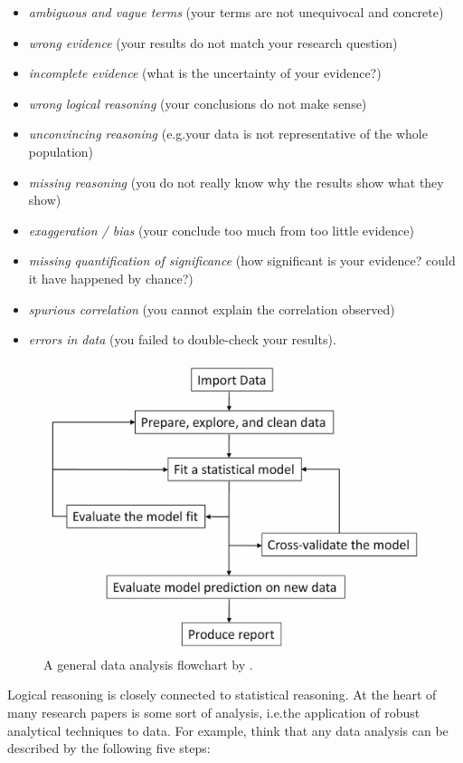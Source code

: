 \documentclass[graybox,envcountchap,sectrefs,UStrade]{svmono}
\begin{document}
\begin{itemize}
  \item \emph{ambiguous and vague terms} (your terms are not unequivocal and concrete)
  \item \emph{wrong evidence} (your results do not match your research question)
  \item \emph{incomplete evidence} (what is the uncertainty of your evidence?)
  \item \emph{wrong logical reasoning} (your conclusions do not make sense)
  \item \emph{unconvincing reasoning} (e.g.\@ your data is not representative of the whole population)
  \item \emph{missing reasoning} (you do not really know why the results show what they show)
  \item \emph{exaggeration / bias} (your conclude too much from too little evidence)
  \item \emph{missing quantification of significance} (how significant is your evidence? could it have happened by chance?)
  \item \emph{spurious correlation} (you cannot explain the correlation observed)
  \item \emph{errors in data} (you failed to double-check your results).
\end{itemize}

\begin{figure}[!hbt]
 \begin{center}
  \includegraphics[width=.65\textwidth]{Fig_data_analysis_flowchart_Kabacoff.jpg}
 \caption{A general data analysis flowchart by \citet{Kabacoff2011}.} \label{Fig:data_analysis_flowchart_Kabacoff}
 \end{center}
\end{figure}

Logical reasoning is closely connected to statistical reasoning. At the heart of many research papers is some sort of analysis, i.e.\@ the application of robust analytical techniques to data. For example, \citet{Adrienko2005} think that any data analysis can be described by the following five steps:
\end{document}

